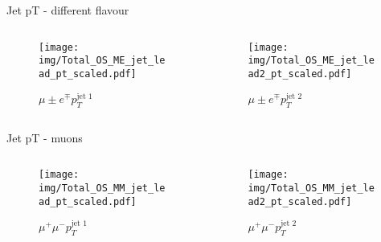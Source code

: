\documentclass{beamer}
\begin{document}
\begin{frame}{Jet pT - different flavour}
  \begin{columns}
    \begin{column}{0.45\textwidth}\begin{figure}
      \caption{$\mu{\pm}e^{\mp}$$p_{T}^{\text{jet 1}}$}
      \texttt{[image: img/Total\_OS\_ME\_jet\_lead\_pt\_scaled.pdf]}
    \end{figure}\end{column}
    \begin{column}{0.45\textwidth}\begin{figure}
      \caption{$\mu{\pm}e^{\mp}$$p_{T}^{\text{jet 2}}$}
      \texttt{[image: img/Total\_OS\_ME\_jet\_lead2\_pt\_scaled.pdf]}
    \end{figure}\end{column}
  \end{columns}
\end{frame}

\begin{frame}{Jet pT - muons}
  \begin{columns}
    \begin{column}{0.45\textwidth}\begin{figure}
      \caption{$\mu^{+}\mu^{-}$$p_{T}^{\text{jet 1}}$}
      \texttt{[image: img/Total\_OS\_MM\_jet\_lead\_pt\_scaled.pdf]}
    \end{figure}\end{column}
    \begin{column}{0.45\textwidth}\begin{figure}
      \caption{$\mu^{+}\mu^{-}$$p_{T}^{\text{jet 2}}$}
      \texttt{[image: img/Total\_OS\_MM\_jet\_lead2\_pt\_scaled.pdf]}
    \end{figure}\end{column}
  \end{columns}
\end{frame}
\end{document}
